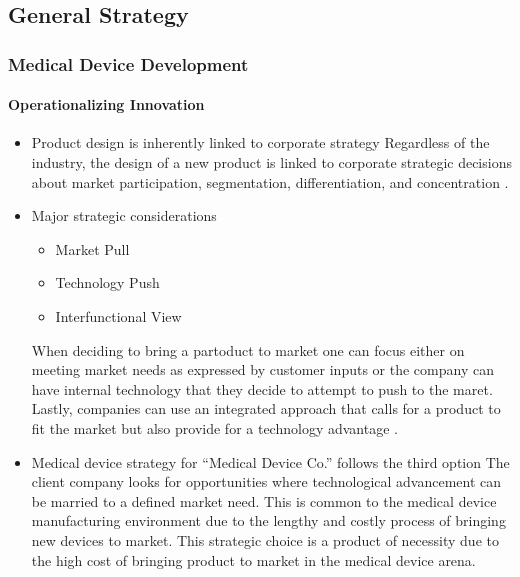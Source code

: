 \subsection{General Strategy}
\begin{frame}
  \frametitle{Medical Device Development}
  \framesubtitle{Operationalizing Innovation}
  \begin{itemize}
    \item<1-> Product design is inherently linked to corporate strategy
       {\scriptsize{Regardless of the industry, the design of a new product is linked to corporate strategic decisions about market participation, segmentation, differentiation, and concentration \parencite{Tracy2015}.}}
    \item<2-> Major strategic considerations
      \begin{itemize}
        \item<2-> Market Pull
        \item<2-> Technology Push
        \item<2-> Interfunctional View
      \end{itemize}
       {\scriptsize{When deciding to bring a partoduct to market one can focus either on meeting market needs as expressed by customer inputs or the company can have internal technology that they decide to attempt to push to the maret. Lastly, companies can use an integrated approach that calls for a product to fit the market but also provide for a technology advantage \parencite[][p. 41]{schroederOperationsManagementContemporary2010}.}}


    \item<3-> Medical device strategy for ``Medical Device Co.'' follows the third option
       {\scriptsize{The client company looks for opportunities where technological advancement can be married to a defined market need. This is common to the medical device manufacturing environment due to the lengthy and costly process of bringing new devices to market. This strategic choice is a product of necessity due to the high cost of bringing product to market in the medical device arena. }}

  \end{itemize}
\end{frame}
